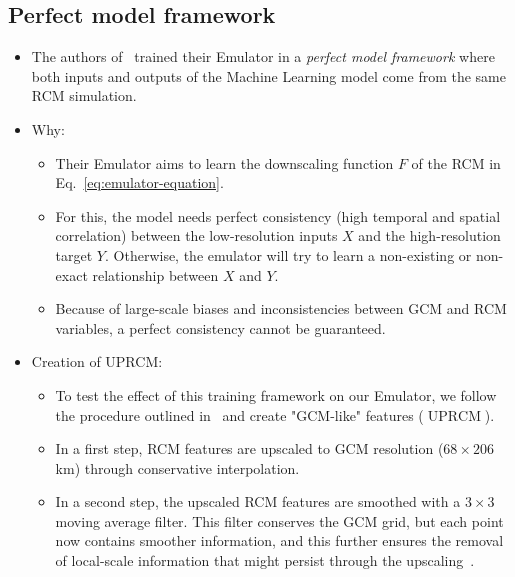 \documentclass[a4paper,11pt,oneside]{report}
\begin{document}
\subsection{Perfect model framework}\label{subsec:perfect-model}
\begin{itemize}
    \item The authors of~\cite{Kittel} trained their Emulator in a \textit{perfect model framework} where both inputs and outputs of the Machine Learning model come from the same RCM simulation. 
    \item Why:
    \begin{itemize}
        \item Their Emulator aims to learn the downscaling function $F$ of the RCM in Eq.~\ref{eq:emulator-equation}.
        \item For this, the model needs perfect consistency (high temporal and spatial correlation) between the low-resolution inputs $X$ and the high-resolution target $Y$. Otherwise, the emulator will try to learn a non-existing or non-exact relationship between $X$ and $Y$.
        \item Because of large-scale biases and inconsistencies between GCM and RCM variables, a perfect consistency cannot be guaranteed.
    \end{itemize}
    \item Creation of UPRCM: 
    \begin{itemize}
        \item To test the effect of this training framework on our Emulator, we follow the procedure outlined in~\cite{Doury} and create "GCM-like" features ($\operatorname{UPRCM}$).
        \item In a first step, RCM features are upscaled to GCM resolution ($68\times206$ km) through conservative interpolation. 
        \item In a second step, the upscaled RCM features are smoothed with a $3\times3$ moving average filter. This filter conserves the GCM grid, but each point now contains smoother information, and this further ensures the removal of local-scale information that might persist through the upscaling~\cite{Doury, Klaver2020}.
    \end{itemize}
\end{itemize}
\end{document}
